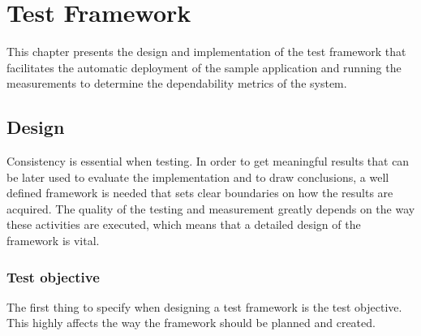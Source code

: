 \chapter{Test Framework}

This chapter presents the design and implementation of the test framework that facilitates the automatic deployment of the sample application and running the measurements to determine the dependability metrics of the system.

\section{Design}

Consistency is essential when testing. In order to get meaningful results that can be later used to evaluate the implementation and to draw conclusions, a well defined framework is needed that sets clear boundaries on how the results are acquired. The quality of the testing and measurement greatly depends on the way these activities are executed, which means that a detailed design of the framework is vital.

%	

\subsection{Test objective} \label{test-design-objective}

The first thing to specify when designing a test framework is the test objective. This highly affects the way the framework should be planned and created.

